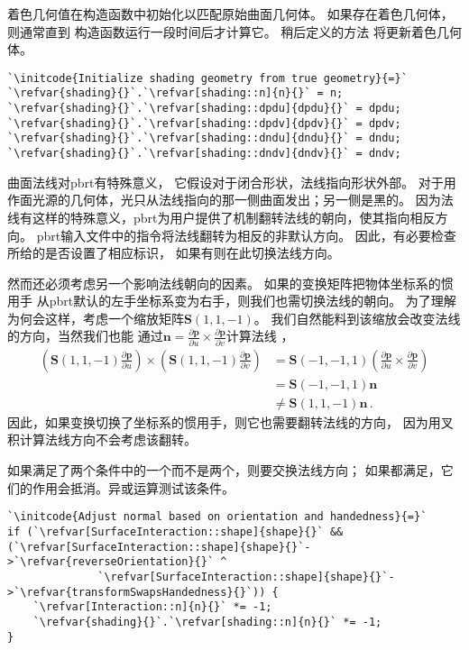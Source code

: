 着色几何值在构造函数中初始化以匹配原始曲面几何体。
如果存在着色几何体，则通常直到
构造函数运行一段时间后才计算它。
稍后定义的方法
将更新着色几何体。
\begin{lstlisting}
`\initcode{Initialize shading geometry from true geometry}{=}`
`\refvar{shading}{}`.`\refvar[shading::n]{n}{}` = n;
`\refvar{shading}{}`.`\refvar[shading::dpdu]{dpdu}{}` = dpdu;
`\refvar{shading}{}`.`\refvar[shading::dpdv]{dpdv}{}` = dpdv;
`\refvar{shading}{}`.`\refvar[shading::dndu]{dndu}{}` = dndu;
`\refvar{shading}{}`.`\refvar[shading::dndv]{dndv}{}` = dndv;
\end{lstlisting}

曲面法线对pbrt有特殊意义，
它假设对于闭合形状，法线指向形状外部。
对于用作面光源的几何体，光只从法线指向的那一侧曲面发出；另一侧是黑的。
因为法线有这样的特殊意义，pbrt为用户提供了机制翻转法线的朝向，使其指向相反方向。
pbrt输入文件中的指令将法线翻转为相反的非默认方向。
因此，有必要检查所给的是否设置了相应标识，
如果有则在此切换法线方向。

然而还必须考虑另一个影响法线朝向的因素。
如果的变换矩阵把物体坐标系的惯用手
从pbrt默认的左手坐标系变为右手，则我们也需切换法线的朝向。
为了理解为何会这样，考虑一个缩放矩阵$\bm S(1,1,-1)$。
我们自然能料到该缩放会改变法线的方向，当然我们也能
通过$\displaystyle\bm n=\frac{\partial\bm p}{\partial u}\times\frac{\partial\bm p}{\partial v}$计算法线
，
\begin{align*}
    \left(\bm S(1,1,-1)\frac{\partial\bm p}{\partial u}\right)\times\left(\bm S(1,1,-1)\frac{\partial\bm p}{\partial v}\right) & =\bm S(-1,-1,1)\left(\frac{\partial\bm p}{\partial u}\times\frac{\partial\bm p}{\partial v}\right) \\
                                                                                                                               & =\bm S(-1,-1,1)\bm n                                                                               \\
                                                                                                                               & \neq \bm S(1,1,-1)\bm n\, .
\end{align*}
因此，如果变换切换了坐标系的惯用手，则它也需要翻转法线的方向，
因为用叉积计算法线方向不会考虑该翻转。

如果满足了两个条件中的一个而不是两个，则要交换法线方向；
如果都满足，它们的作用会抵消。异或运算测试该条件。
\begin{lstlisting}
`\initcode{Adjust normal based on orientation and handedness}{=}`
if (`\refvar[SurfaceInteraction::shape]{shape}{}` && (`\refvar[SurfaceInteraction::shape]{shape}{}`->`\refvar{reverseOrientation}{}` ^
              `\refvar[SurfaceInteraction::shape]{shape}{}`->`\refvar{transformSwapsHandedness}{}`)) {
    `\refvar[Interaction::n]{n}{}` *= -1;
    `\refvar{shading}{}`.`\refvar[shading::n]{n}{}` *= -1;
}
\end{lstlisting}


